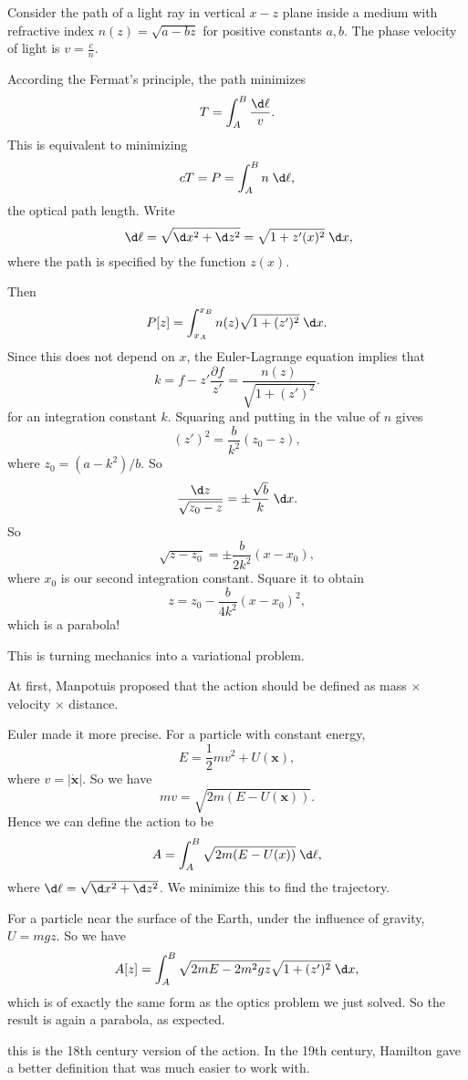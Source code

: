 \documentclass[a4paper]{article}
\begin{document}
\begin{eg}
  Consider the path of a light ray in vertical $x-z$ plane inside a medium with refractive index $n(z) = \sqrt{a - bz}$ for positive constants $a, b$. The phase velocity of light is $v = \frac{c}{n}$.

  According the Fermat's principle, the path minimizes
  \[
    T = \int_A^B \frac{\d \ell}{v}.
  \]
  This is equivalent to minimizing
  \[
    cT = P = \int_A^B n\;\d \ell,
  \]
  the optical path length. Write 
  \[
    \;\d \ell = \sqrt{\d x^2 + \d z^2} = \sqrt{1 + z'(x)^2}\;\d x,
  \]
  where the path is specified by the function $z(x)$.

  Then
  \[
    P[z] = \int_{x_A}^{x_B}n(z)\sqrt{1 + (z')^2}\;\d x.
  \]
  Since this does not depend on $x$, the Euler-Lagrange equation implies that
  \[
    k = f - z'\frac{\partial f}{z'} = \frac{n(z)}{\sqrt{1 + (z')^2}}.
  \]
  for an integration constant $k$. Squaring and putting in the value of $n$ gives
  \[
    (z')^2 = \frac{b}{k^2}(z_0 - z),
  \]
  where $z_0 = (a - k^2)/b$. So
  \[
    \frac{\d z}{\sqrt{z_0 - z}} = \pm\frac{\sqrt{b}}{k}\;\d x.
  \]
  So
  \[ \sqrt{z - z_0} = \pm \frac{b}{2k^2}(x - x_0),
  \]
  where $x_0$ is our second integration constant. Square it to obtain
  \[
    z = z_0 - \frac{b}{4k^2}(x - x_0)^2,
  \]
  which is a parabola!
\end{eg}

\begin{eg}
  This is turning mechanics into a variational problem.

  At first, Manpotuis proposed that the action should be defined as mass $\times$ velocity $\times$ distance.

  Euler made it more precise. For a particle with constant energy,
  \[
    E = \frac{1}{2} mv^2 + U(\mathbf{x}),
  \]
  where $v = |\dot{\mathbf{x}}|$. So we have
  \[
    mv = \sqrt{2m(E - U(\mathbf{x}))}.
  \]
  Hence we can define the action to be
  \[
    A = \int_A^B \sqrt{2m(E - U(x))}\;\d \ell,
  \]
  where $\d\ell = \sqrt{\d x^2 + \d z^2}$. We minimize this to find the trajectory.

  For a particle near the surface of the Earth, under the influence of gravity, $U = mgz$. So we have
  \[
    A[z] = \int_A^B \sqrt{2mE - 2m^2gz}\sqrt{1 + (z')^2}\;\d x,
  \]
  which is of exactly the same form as the optics problem we just solved. So the result is again a parabola, as expected.
\end{eg}
\note this is the 18th century version of the action. In the 19th century, Hamilton gave a better definition that was much easier to work with.
\end{document}
